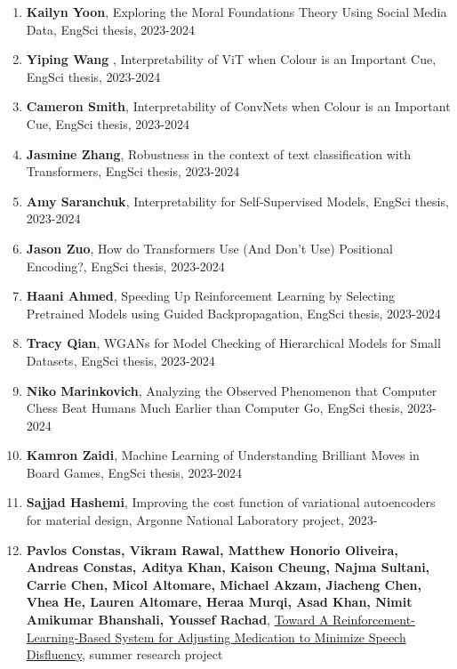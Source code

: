 \documentclass[letterpaper,11pt]{article}
\begin{document}
\begin{enumerate}
	
	\item
	\textbf{Kailyn Yoon}, Exploring the Moral Foundations Theory Using Social Media Data, EngSci thesis, 2023-2024


	\item
	\textbf{Yiping Wang }, Interpretability of ViT when Colour is an Important Cue, EngSci thesis, 2023-2024


	\item
	\textbf{Cameron Smith}, Interpretability of ConvNets when Colour is an Important Cue, EngSci thesis, 2023-2024

	

	\item
	\textbf{Jasmine Zhang}, Robustness in the context of text classification with Transformers, EngSci thesis, 2023-2024

	\item
	\textbf{Amy Saranchuk}, Interpretability for Self-Supervised Models, EngSci thesis, 2023-2024


	\item
	\textbf{Jason Zuo}, How do Transformers Use (And Don't Use) Positional Encoding?, EngSci thesis, 2023-2024

	\item
	\textbf{Haani Ahmed}, Speeding Up Reinforcement Learning by Selecting Pretrained Models using Guided Backpropagation, EngSci thesis, 2023-2024

	\item
	\textbf{Tracy Qian}, WGANs for Model Checking of Hierarchical Models for Small Datasets, EngSci thesis, 2023-2024


	\item
	\textbf{Niko Marinkovich}, Analyzing the Observed Phenomenon that Computer Chess Beat Humans Much Earlier than Computer Go, EngSci thesis, 2023-2024

	\item
	\textbf{Kamron Zaidi}, Machine Learning of Understanding Brilliant Moves in Board Games, EngSci thesis, 2023-2024
	\item
	\textbf{Sajjad Hashemi}, Improving the cost function of variational autoencoders for material design, Argonne National Laboratory project, 2023-

	\item
	\textbf{Pavlos Constas, Vikram Rawal, Matthew Honorio Oliveira, Andreas Constas, Aditya Khan, Kaison Cheung, Najma Sultani, Carrie Chen, Micol Altomare, Michael Akzam, Jiacheng Chen, Vhea He, Lauren Altomare, Heraa Murqi, Asad Khan, Nimit Amikumar Bhanshali, Youssef Rachad}, \href{https://ceur-ws.org/Vol-3649/Paper23.pdf}{\href{https://ceur-ws.org/Vol-3649/Paper23.pdf}{Toward A Reinforcement-Learning-Based System for Adjusting Medication to Minimize Speech Disfluency}}, summer research project	


\end{enumerate}
\end{document}
